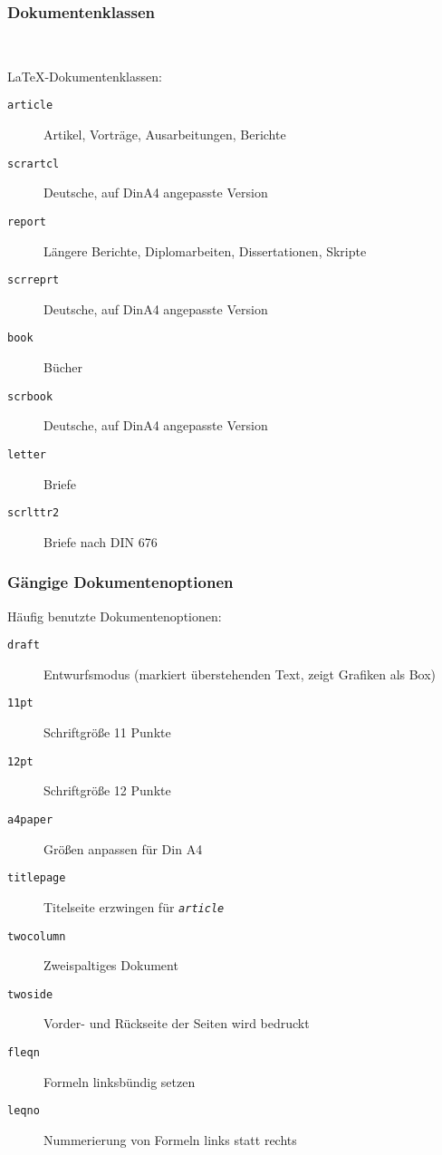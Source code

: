 \begin{frame}[c,fragile]
\frametitle{Dokumentenklassen}

\begin{block}{}
 \\
\end{block}

\LaTeX-Dokumentenklassen:
\begin{description}
\item[\texttt{article}] Artikel, Vortr\"age, Ausarbeitungen, Berichte
\item[\texttt{scrartcl}] Deutsche, auf DinA4 angepasste Version
\item[\texttt{report}] L\"angere Berichte, Diplomarbeiten, Dissertationen, Skripte
\item[\texttt{scrreprt}] Deutsche, auf DinA4 angepasste Version
\item[\texttt{book}] B\"ucher
\item[\texttt{scrbook}] Deutsche, auf DinA4 angepasste Version
\item[\texttt{letter}] Briefe
\item[\texttt{scrlttr2}] Briefe nach DIN 676
\end{description}
\end{frame}

\begin{frame}[c]
\frametitle{G\"angige Dokumentenoptionen}

H\"aufig benutzte Dokumentenoptionen:
\begin{description}
\item[\texttt{draft}] Entwurfsmodus (markiert überstehenden Text, zeigt Grafiken als Box)
\item[\texttt{11pt}] Schriftgr\"o\ss{}e 11 Punkte
\item[\texttt{12pt}] Schriftgr\"o\ss{}e 12 Punkte
\item[\texttt{a4paper}] Gr\"o\ss{}en anpassen f\"ur Din A4
\item[\texttt{titlepage}] Titelseite erzwingen f\"ur \emph{\texttt{article}}
\item[\texttt{twocolumn}] Zweispaltiges Dokument
\item[\texttt{twoside}] Vorder- und R\"uckseite der Seiten wird bedruckt
\item[\texttt{fleqn}] Formeln linksb\"undig setzen
\item[\texttt{leqno}] Nummerierung von Formeln links statt rechts
\end{description}
\end{frame}

